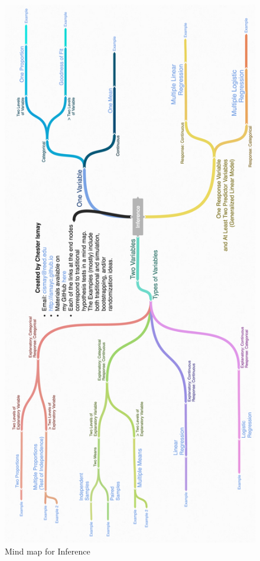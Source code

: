 \documentclass[12pt,]{krantz}
\begin{document}
\begin{figure}

{\centering \includegraphics[width=2\linewidth]{images/coggle} 

}

\caption{Mind map for Inference}\label{fig:infer-map}
\end{figure}
\end{document}

